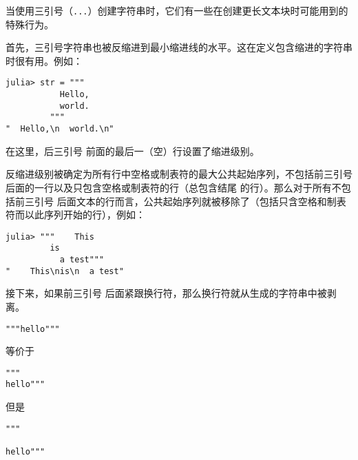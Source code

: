 当使用三引号（\texttt{{\textquotedbl}{\textquotedbl}{\textquotedbl}...{\textquotedbl}{\textquotedbl}{\textquotedbl}}）创建字符串时，它们有一些在创建更长文本块时可能用到的特殊行为。



首先，三引号字符串也被反缩进到最小缩进线的水平。这在定义包含缩进的字符串时很有用。例如：




\begin{verbatim}
julia> str = """
           Hello,
           world.
         """
"  Hello,\n  world.\n"
\end{verbatim}



在这里，后三引号 \texttt{{\textquotedbl}{\textquotedbl}{\textquotedbl}} 前面的最后一（空）行设置了缩进级别。



反缩进级别被确定为所有行中空格或制表符的最大公共起始序列，不包括前三引号 \texttt{{\textquotedbl}{\textquotedbl}{\textquotedbl}} 后面的一行以及只包含空格或制表符的行（总包含结尾 \texttt{{\textquotedbl}{\textquotedbl}{\textquotedbl}} 的行）。那么对于所有不包括前三引号 \texttt{{\textquotedbl}{\textquotedbl}{\textquotedbl}} 后面文本的行而言，公共起始序列就被移除了（包括只含空格和制表符而以此序列开始的行），例如：




\begin{verbatim}
julia> """    This
         is
           a test"""
"    This\nis\n  a test"
\end{verbatim}



接下来，如果前三引号 \texttt{{\textquotedbl}{\textquotedbl}{\textquotedbl}} 后面紧跟换行符，那么换行符就从生成的字符串中被剥离。




\begin{verbatim}
"""hello"""
\end{verbatim}



等价于




\begin{verbatim}
"""
hello"""
\end{verbatim}



但是




\begin{verbatim}
"""

hello"""
\end{verbatim}



